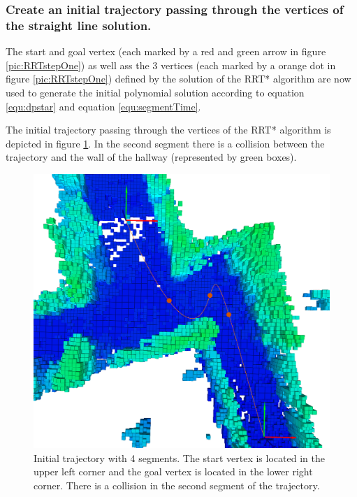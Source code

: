 \subsubsection{Create an initial trajectory passing through the vertices of the straight line solution.}

The start and goal vertex (each marked by a red and green arrow in figure \ref{pic:RRTstepOne}) as well ass the 3 vertices (each marked by a orange dot in figure \ref{pic:RRTstepOne}) defined by the solution of the RRT* algorithm are now used to generate the initial polynomial solution according to equation \ref{equ:dpstar} and equation \ref{equ:segmentTime}. \newline

The initial trajectory passing through the vertices of the RRT* algorithm is depicted in figure \ref{pic:RRTstepTwo}. In the second segment there is a collision between the trajectory and the wall of the hallway (represented by green boxes). 



\begin{figure}[h]
   \centering
   \includegraphics[trim = 45mm 0mm 35mm 0mm,clip,width=1\textwidth]{pics/extensionALongP.png}
   \caption{Initial trajectory with 4 segments. The start vertex is located in the upper left corner and the goal vertex is located in the lower right corner. There is a collision in the second segment of the trajectory.}
\label{pic:RRTstepTwo}
\end{figure}

